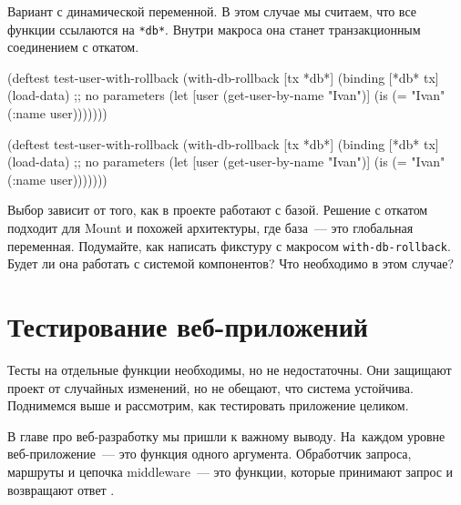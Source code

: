 \fi


Вариант с динамической переменной. В этом случае мы считаем, что все функции
ссылаются на \verb|*db*|. Внутри макроса она станет транзакционным соединением
с откатом.

\ifx\devicetype\mobile

\begin{english}
  \begin{clojure}
(deftest test-user-with-rollback
  (with-db-rollback [tx *db*]
    (binding [*db* tx]
      (load-data) ;; no parameters
      (let [user
            (get-user-by-name "Ivan")]
        (is (= "Ivan" (:name user)))))))
  \end{clojure}
\end{english}

\else

\begin{english}
  \begin{clojure}
(deftest test-user-with-rollback
  (with-db-rollback [tx *db*]
    (binding [*db* tx]
      (load-data) ;; no parameters
      (let [user (get-user-by-name "Ivan")]
        (is (= "Ivan" (:name user)))))))
  \end{clojure}
\end{english}

\fi

Выбор зависит от того, как в проекте работают с базой. Решение с откатом
подходит для Mount и похожей архитектуры, где база~--- это глобальная
переменная. Подумайте, как написать фикстуру с макросом
\verb|with-db-rollback|. Будет ли она работать с системой компонентов? Что
необходимо в этом случае?

\section{Тестирование веб-приложений}


Тесты на отдельные функции необходимы, но не недостаточны. Они защищают проект от
случайных изменений, но не обещают, что система устойчива. Поднимемся выше и
рассмотрим, как тестировать приложение целиком.

В главе про веб-разработку мы пришли к важному выводу. На~каждом уровне
веб-приложение~--- это функция одного аргумента. Обработчик запроса, маршруты и
цепочка middleware~--- это функции, которые принимают запрос и возвращают
ответ .

